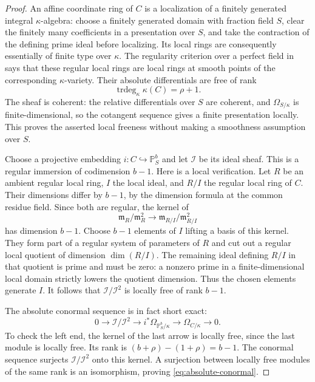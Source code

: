 \begin{proof}
An affine coordinate ring of $C$ is a localization of a finitely
generated integral $\kappa$-algebra: choose a finitely generated domain
with fraction field $S$, clear the finitely many coefficients in a
presentation over $S$, and take the contraction of the defining prime
ideal before localizing.  Its local rings are consequently essentially
of finite type over $\kappa$.  The regularity criterion over a perfect
field in  says that these regular local rings
are local rings at smooth points of the corresponding
$\kappa$-variety.  Their absolute differentials are free of rank
\[
 \operatorname{trdeg}_\kappa\kappa(C)=\rho+1.
\]
The sheaf is coherent: the relative differentials over $S$ are coherent,
and $\Omega_{S/\kappa}$ is finite-dimensional, so the cotangent sequence
gives a finite presentation locally.  This proves the asserted local
freeness without making a smoothness assumption over $S$.

Choose a projective embedding $i:C\hookrightarrow\mathbb P^b_S$ and let
$\mathcal I$ be its ideal sheaf.  This is a regular immersion of
codimension $b-1$.  Here is a local verification.  Let $R$ be an ambient
regular local ring, $I$ the local ideal, and $R/I$ the regular local ring
of $C$.  Their dimensions differ by $b-1$, by the dimension formula at
the common residue field.  Since both are regular, the kernel of
\[
 \mathfrak m_R/\mathfrak m_R^2
   \longrightarrow
 \mathfrak m_{R/I}/\mathfrak m_{R/I}^2
\]
has dimension $b-1$.  Choose $b-1$ elements of $I$ lifting a basis of this
kernel.  They form part of a regular system of parameters of $R$ and
cut out a regular local quotient of dimension $\dim(R/I)$.
The remaining ideal defining $R/I$ in that quotient is prime and must
be zero: a nonzero prime in a finite-dimensional local domain strictly
lowers the quotient dimension.  Thus the chosen elements generate $I$.
It follows that $\mathcal I/\mathcal I^2$ is locally free of rank $b-1$.

The absolute conormal sequence is in fact short exact:
\begin{equation}
 0\longrightarrow\mathcal I/\mathcal I^2
 \longrightarrow i^*\Omega_{\mathbb P^b_S/\kappa}
 \longrightarrow\Omega_{C/\kappa}\longrightarrow0.
 \label{eq:absolute-conormal}
\end{equation}
To check the left end, the kernel of the last arrow is locally free,
since the last module is locally free.  Its rank is
$(b+\rho)-(1+\rho)=b-1$.  The conormal sequence surjects
$\mathcal I/\mathcal I^2$ onto this kernel.  A surjection between locally
free modules of the same rank is an isomorphism, proving
\eqref{eq:absolute-conormal}.


\end{proof}
